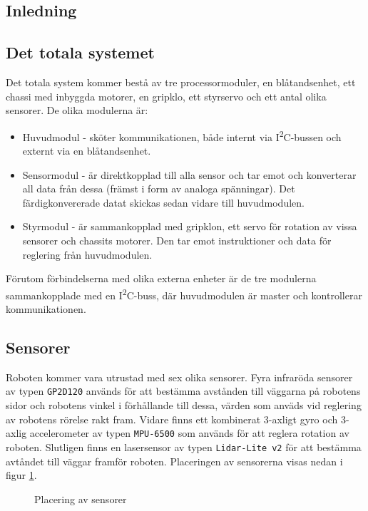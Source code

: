 \documentclass[11pt]{article}
\begin{document}
\begin{flushleft}
\section{Inledning}
\lipsum

\subsection{Det totala systemet}
Det totala system kommer bestå av tre processormoduler, en blåtandsenhet, ett chassi med inbyggda motorer, en gripklo, ett styrservo och ett antal olika sensorer. De olika modulerna är:
\begin{itemize}
	\item Huvudmodul - sköter kommunikationen, både internt via I\textsuperscript{2}C-bussen och externt via en blåtandsenhet.
	\item Sensormodul - är direktkopplad till alla sensor och tar emot och konverterar all data från dessa (främst i form av analoga spänningar). Det färdigkonvererade datat skickas sedan vidare till huvudmodulen.
	\item Styrmodul - är sammankopplad med gripklon, ett servo för rotation av vissa sensorer och chassits motorer. Den tar emot instruktioner och data för reglering från huvudmodulen.
\end{itemize}
Förutom förbindelserna med olika externa enheter är de tre modulerna sammankopplade med en I\textsuperscript{2}C-buss, där huvudmodulen är master och kontrollerar kommunikationen. 

\subsection{Sensorer}
Roboten kommer vara utrustad med sex olika sensorer. Fyra infraröda sensorer av typen \verb+GP2D120+ används för att bestämma avstånden till väggarna på robotens sidor och robotens vinkel i förhållande till dessa, värden som anväds vid reglering av robotens rörelse rakt fram. Vidare finns ett kombinerat 3-axligt gyro och 3-axlig accelerometer av typen \verb+MPU-6500+ som används för att reglera rotation av roboten. Slutligen finns en lasersensor av typen \verb+Lidar-Lite v2+ för att bestämma avtåndet till väggar framför roboten. Placeringen av sensorerna visas nedan i figur \ref{sensor}.

\begin{figure}[htbp]
\centering
\noindent\resizebox{.8\linewidth}{!}{
	}
	\caption{Placering av sensorer \label{sensor}}	
\end{figure}


\end{flushleft}
\end{document}

